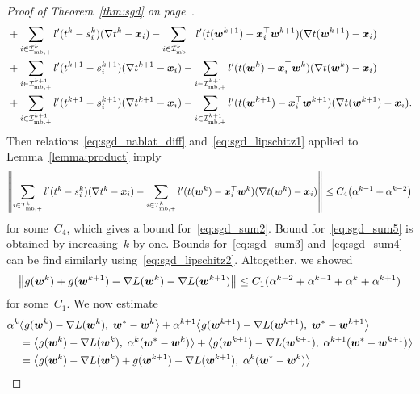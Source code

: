 \begin{proof}[Proof of Theorem~\ref{thm:sgd} on page~\pageref{thm:sgd}]
\begin{subequations}
\begin{align}
    \label{eq:sgd_sum3}
    & + \sum_{i \in \mathcal{I}_{\text{mb},+}^k} l'(t^k - s_i^k)(\nabla t^k - \bm{x}_i) - \sum_{i \in \mathcal{I}_{\text{mb},+}^k} l'(t(\bm{w}^{k+1}) - \bm{x}_i^\top \bm{w}^{k+1})(\nabla t(\bm{w}^{k+1}) - \bm{x}_i)\\
    \label{eq:sgd_sum4}
    & + \sum_{i \in \mathcal{I}_{\text{mb},+}^{k+1}} l'(t^{k+1} - s_i^{k+1})(\nabla t^{k+1} - \bm{x}_i) - \sum_{i\in \mathcal{I}_{\text{mb},+}^{k+1}}l'(t(\bm{w}^k) - \bm{x}_i^\top \bm{w}^k)(\nabla t(\bm{w}^k) - \bm{x}_i) \\
    \label{eq:sgd_sum5}
    & + \sum_{i \in \mathcal{I}_{\text{mb},+}^{k+1}} l'(t^{k+1} - s_i^{k+1})(\nabla t^{k+1} - \bm{x}_i)  - \sum_{i \in \mathcal{I}_{\text{mb},+}^{k+1}} l'(t(\bm{w}^{k+1}) - \bm{x}_i^\top \bm{w}^{k+1})(\nabla t(\bm{w}^{k+1}) - \bm{x}_i).
    \end{align}
  \end{subequations}
  Then relations~\eqref{eq:sgd_nablat_diff} and~\eqref{eq:sgd_lipschitz1} applied to Lemma~\ref{lemma:product} imply
  \begin{equation*}
    \norm{\sum_{i \in \Imbpos^k} l'(t^k - s_i^k)(\nabla t^k - \bm{x}_i) - \sum_{i \in \Imbpos^k} l'(t(\bm{w}^k) - \bm{x}_i^\top \bm{w}^k)(\nabla t(\bm{w}^k) - \bm{x}_i)} \leq C_4 \Brac{\alpha^{k-1} + \alpha^{k-2}}
  \end{equation*}
  for some~$C_4$, which gives a bound for~\eqref{eq:sgd_sum2}. Bound for~\eqref{eq:sgd_sum5} is obtained by increasing~$k$ by one. Bounds for~\eqref{eq:sgd_sum3} and~\eqref{eq:sgd_sum4} can be find similarly using~\eqref{eq:sgd_lipschitz2}. Altogether, we showed
  \begin{equation}\label{eq:nec_cond3}
    \norm{g(\bm{w}^k) + g(\bm{w}^{k+1}) - \nabla L(\bm{w}^k) - \nabla L(\bm{w}^{k+1})}
      \leq C_1(\alpha^{k-2} + \alpha^{k-1} + \alpha^{k} + \alpha^{k+1})
  \end{equation}
  for some~$C_1$. We now estimate
  \begin{equation}\label{eq:proof_est1}
    \begin{aligned}
      \alpha^k
      & \inner{ g(\bm{w}^{k})-\nabla L(\bm{w}^{k})}{\bm{w}^*-\bm{w}^{k}} + \alpha^{k+1}\inner{ g(\bm{w}^{k+1})-\nabla L(\bm{w}^{k+1})}{\bm{w}^*-\bm{w}^{k+1}} \\
      & = \inner{ g(\bm{w}^{k})-\nabla L(\bm{w}^{k})}{\alpha^k(\bm{w}^*-\bm{w}^{k})}
        + \inner{ g(\bm{w}^{k+1})-\nabla L(\bm{w}^{k+1})}{\alpha^{k+1}(\bm{w}^*-\bm{w}^{k+1})} \\
      & = \inner{ g(\bm{w}^{k})-\nabla L(\bm{w}^{k}) + g(\bm{w}^{k+1})-\nabla L(\bm{w}^{k+1})}{\alpha^k(\bm{w}^*-\bm{w}^{k})} \\

\end{aligned}
\end{equation}
\end{proof}
